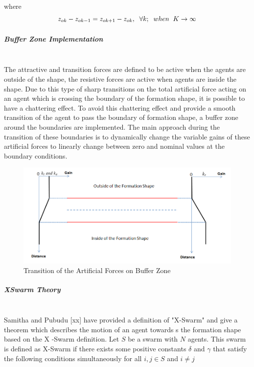 \documentclass[twoside]{article}
\begin{document}
			where
			\begin{equation}
		z_{ok}- z_{ok -1} = z_{ok+1} - z_{ok}, \hspace{0.2cm}  \forall k ;  \hspace{0.2cm} when  \hspace{0.2cm} K \to\infty
			\end{equation}
			
			
			\subparagraph{Buffer Zone Implementation}\hspace{0pt} \\
			
     The attractive and transition forces are defined to be active when the agents are outside of the shape, the resistive forces are active when agents are inside the shape. Due to this type of sharp transitions on the total artificial force acting on an agent which is crossing the boundary of the formation shape, it is possible to have a chattering effect. To avoid this chattering effect and provide a smooth transition of the agent to pass the boundary of formation shape, a buffer zone around the boundaries are implemented. The main approach during the transition of these boundaries is to dynamically change the variable gains of these artificial forces to linearly change between zero and nominal values at the boundary conditions. 
     
			\begin{figure}[H]
				\caption{Transition of the Artificial Forces on Buffer Zone}
				\centering
				\includegraphics[scale = 0.50]{buffer_zone}
			\end{figure}
			
			
			\subparagraph{XSwarm Theory}\hspace{0pt} \\

			
			Samitha and Pubudu [xx] have provided a definition of "X-Swarm" and give a theorem which describes the motion of an agent towards s the formation shape based on the X -Swarm definition. Let $S$ be a swarm with $N$ agents. This swarm is defined as X-Swarm if there exists some positive constants $\delta$ and  $ \gamma$ that satisfy the following conditions simultaneously for all $i,j \in S$ and $i \neq j$
			
\end{document}
